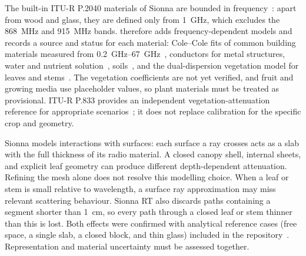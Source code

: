 The built-in ITU-R P.2040 materials of Sionna are bounded in frequency~\cite{itu2040}: apart from wood and glass, they are defined only from \SI{1}{GHz}, which excludes the \SI{868}{MHz} and \SI{915}{MHz} bands. \housionna{} therefore adds frequency-dependent models and records a source and status for each material: Cole--Cole fits of common building materials measured from \SIrange{0.2}{67}{GHz}~\cite{zhekov2020}, conductors for metal structures, water and nutrient solution~\cite{liebe1991}, soils~\cite{itu527}, and the dual-dispersion vegetation model for leaves and stems~\cite{ulaby1987}. The vegetation coefficients are not yet verified, and fruit and growing media use placeholder values, so plant materials must be treated as provisional. ITU-R P.833 provides an independent vegetation-attenuation reference for appropriate scenarios~\cite{itu833}; it does not replace calibration for the specific crop and geometry.

Sionna models interactions with surfaces: each surface a ray crosses acts as a slab with the full thickness of its radio material. A closed canopy shell, internal sheets, and explicit leaf geometry can produce different depth-dependent attenuation. Refining the mesh alone does not resolve this modelling choice. When a leaf or stem is small relative to wavelength, a surface ray approximation may miss relevant scattering behaviour. Sionna RT also discards paths containing a segment shorter than \SI{1}{cm}, so every path through a closed leaf or stem thinner than this is lost. Both effects were confirmed with analytical reference cases (free space, a single slab, a closed block, and thin glass) included in the repository~\cite{housionna}. Representation and material uncertainty must be assessed together.



